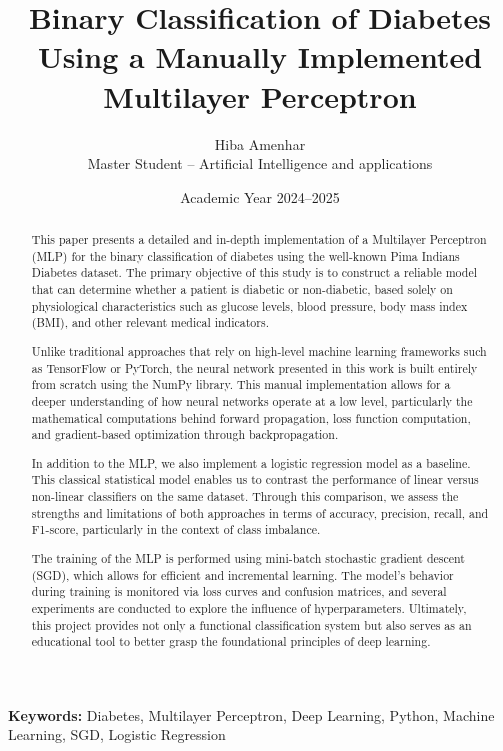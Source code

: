 \documentclass[12pt]{article}
\title{Binary Classification of Diabetes Using a Manually Implemented Multilayer Perceptron}
\author{Hiba Amenhar \\ Master Student – Artificial Intelligence and applications}
\date{Academic Year 2024–2025}
\begin{document}
\maketitle

\begin{abstract}
This paper presents a detailed and in-depth implementation of a Multilayer Perceptron (MLP) for the binary classification of diabetes using the well-known Pima Indians Diabetes dataset. The primary objective of this study is to construct a reliable model that can determine whether a patient is diabetic or non-diabetic, based solely on physiological characteristics such as glucose levels, blood pressure, body mass index (BMI), and other relevant medical indicators.

Unlike traditional approaches that rely on high-level machine learning frameworks such as TensorFlow or PyTorch, the neural network presented in this work is built entirely from scratch using the NumPy library. This manual implementation allows for a deeper understanding of how neural networks operate at a low level, particularly the mathematical computations behind forward propagation, loss function computation, and gradient-based optimization through backpropagation.

In addition to the MLP, we also implement a logistic regression model as a baseline. This classical statistical model enables us to contrast the performance of linear versus non-linear classifiers on the same dataset. Through this comparison, we assess the strengths and limitations of both approaches in terms of accuracy, precision, recall, and F1-score, particularly in the context of class imbalance.

The training of the MLP is performed using mini-batch stochastic gradient descent (SGD), which allows for efficient and incremental learning. The model's behavior during training is monitored via loss curves and confusion matrices, and several experiments are conducted to explore the influence of hyperparameters. Ultimately, this project provides not only a functional classification system but also serves as an educational tool to better grasp the foundational principles of deep learning.
\end{abstract}

\textbf{Keywords:} Diabetes, Multilayer Perceptron, Deep Learning, Python, Machine Learning, SGD, Logistic Regression
\newpage
\tableofcontents
\newpage
\end{document}
